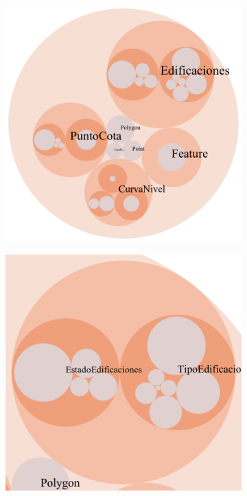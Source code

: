 \begin{figure}[H]
	\centering
	\begin{subfigure}[h]{0.33\textwidth} 
		\includegraphics[width=\textwidth]{imagenes/capitulo5/class-hierarchy-TFM}
		\caption{}
	\end{subfigure}       
	\begin{subfigure}[h]{0.33\textwidth} 
		\includegraphics[width=\textwidth]{imagenes/capitulo5/class-hierarchy-TFM-2}

\end{subfigure}
\end{figure}
